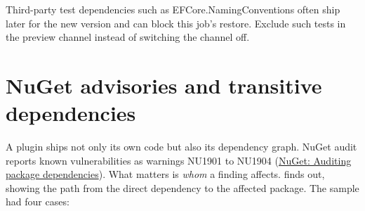 
Third-party test dependencies such as EFCore.NamingConventions often ship later for the new
version and can block this job's restore. Exclude such tests in the preview channel instead
of switching the channel off.

\section{NuGet advisories and transitive dependencies}\label{sec:nuget-advisories}

A plugin ships not only its own code but also its dependency graph. NuGet audit reports known
vulnerabilities as warnings NU1901 to NU1904
(\href{https://learn.microsoft.com/en-us/nuget/concepts/auditing-packages}{NuGet: Auditing package dependencies}).
What matters is \emph{whom} a finding affects.  finds out, showing the path
from the direct dependency to the affected package. The sample had four cases:

